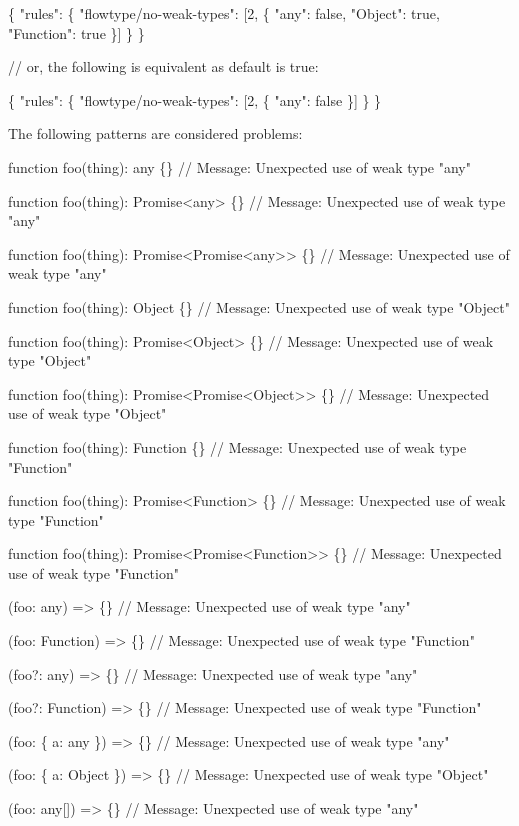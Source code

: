 \begin{DoxyCode}
\{
    "rules": \{
        "flowtype/no-weak-types": [2, \{
            "any": false,
            "Object": true,
            "Function": true
        \}]
    \}
\}

// or, the following is equivalent as default is true:

\{
    "rules": \{
        "flowtype/no-weak-types": [2, \{
            "any": false
        \}]
    \}
\}
\end{DoxyCode}


The following patterns are considered problems\+:


\begin{DoxyCode}
function foo(thing): any \{\}
// Message: Unexpected use of weak type "any"

function foo(thing): Promise<any> \{\}
// Message: Unexpected use of weak type "any"

function foo(thing): Promise<Promise<any>> \{\}
// Message: Unexpected use of weak type "any"

function foo(thing): Object \{\}
// Message: Unexpected use of weak type "Object"

function foo(thing): Promise<Object> \{\}
// Message: Unexpected use of weak type "Object"

function foo(thing): Promise<Promise<Object>> \{\}
// Message: Unexpected use of weak type "Object"

function foo(thing): Function \{\}
// Message: Unexpected use of weak type "Function"

function foo(thing): Promise<Function> \{\}
// Message: Unexpected use of weak type "Function"

function foo(thing): Promise<Promise<Function>> \{\}
// Message: Unexpected use of weak type "Function"

(foo: any) => \{\}
// Message: Unexpected use of weak type "any"

(foo: Function) => \{\}
// Message: Unexpected use of weak type "Function"

(foo?: any) => \{\}
// Message: Unexpected use of weak type "any"

(foo?: Function) => \{\}
// Message: Unexpected use of weak type "Function"

(foo: \{ a: any \}) => \{\}
// Message: Unexpected use of weak type "any"

(foo: \{ a: Object \}) => \{\}
// Message: Unexpected use of weak type "Object"

(foo: any[]) => \{\}
// Message: Unexpected use of weak type "any"


\end{DoxyCode}
